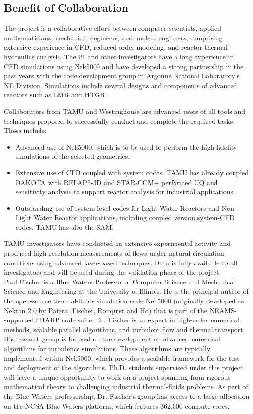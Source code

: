 
\newpage

\subsection*{Benefit of Collaboration}

The project is a collaborative effort between computer scientists, applied
mathematicians, mechanical engineers, and nuclear engineers, comprising
extensive experience in CFD, reduced-order modeling, and reactor thermal
hydraulics analysis.    
  The PI and other investigators have a long experience in CFD simulations
using Nek5000 and have developed a strong partnership in the past years with
the code development group in Argonne National Laboratory's NE Division.  
Simulations include several designs and components of advanced reactors such as
LMR and HTGR. 


Collaborators from TAMU and Westinghouse are advanced users of all tools and
techniques proposed to successfully conduct and complete the required tasks.
These include:
\begin{itemize}
\item
Advanced use of Nek5000, which is to be used to perform the
high fidelity simulations of the selected geometries. 
\item
Extensive use of CFD coupled with system codes. TAMU has already coupled DAKOTA
with RELAP5-3D and STAR-CCM+ performed UQ and sensitivity analysis to support
reactor analysis for industrial applications. 
\item
Outstanding use of system-level codes for Light Water Reactors and Non-Light
Water Reactor applications, including coupled version system-CFD codes. TAMU
has also the SAM.
\end{itemize}
TAMU investigators have conducted an extensive experimental activity and
produced high resolution measurements of flows under natural circulation
conditions using advanced laser-based techniques. Data is fully available to
all investigators and will be used during the validation phase of the project. 
\\

Paul Fischer is a Blue Waters Professor of Computer Science and Mechanical
Science and Engineering at the University of Illinois.
He is the principal author of the open-source thermal-fluids
simulation code Nek5000 (originally developed as Nekton 2.0 by Patera,
Fischer, Ronquist and Ho) that is part of the NEAMS-supported SHARP code
suite.  Dr. Fischer is an expert in high-order numerical methods, scalable
parallel algorithms, and turbulent flow and thermal transport.  His research
group is focused on the development of advanced numerical algorithms for
turbulence simulations.  These algorithms are typically implemented within
Nek5000, which provides a scalable framework for the test and deployment
of the algorithms.  Ph.D. students supervised under this project
will have a unique opportunity to work on a project spanning from
rigorous mathematical theory to challenging industrial thermal-fluids
problems.   As part of the Blue Waters professorship, Dr. Fischer's
group has access to a large allocation on the NCSA Blue Waters platform,
which features 362,000 compute cores.
\\

